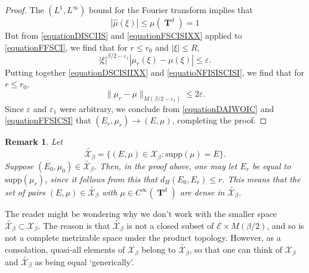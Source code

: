 \documentclass[12pt,reqno]{article}
\numberwithin{equation}{section}
\DeclareMathOperator{\TT}{\mathbf{T}}
\newtheorem{remark}{Remark}
\begin{document}
\begin{proof}
    The $(L^1,L^\infty)$ bound for the Fourier transform implies that
    \begin{equation} \label{equationFSCISIXX}
        |\widehat{\mu}(\xi)| \leq \mu(\TT^d) = 1
    \end{equation}
    But from \eqref{equationDISCIIS} and \eqref{equationFSCISIXX} applied to \eqref{equationFFSCI}, we find that for $r \leq r_0$ and $|\xi| \leq R$,
    \begin{equation} \label{equatioNFISISCISI}
        |\xi|^{\beta/2 - \varepsilon_1} |\mu_r(\xi) - \mu(\xi)| \leq \varepsilon.
    \end{equation}
    Putting together \eqref{equationDSCISIIXX} and \eqref{equatioNFISISCISI}, we find that for $r \leq r_0$,
    \begin{equation} \label{equationDAIWOIC}
        \| \mu_r - \mu \|_{M(\beta/2 - \varepsilon_1)} \leq 2\varepsilon.
    \end{equation}
    Since $\varepsilon$ and $\varepsilon_1$ were arbitrary, we conclude from \eqref{equationDAIWOIC} and \eqref{equationFFSICSI} that $(E_r,\mu_r) \to (E,\mu)$, completing the proof.
\end{proof}

\begin{remark} \label{remarkDOIWJDIOWJ2}
    Let
    \[ \tilde{\mathcal{X}_\beta} = \{ (E,\mu) \in \mathcal{X}_\beta : \text{supp}(\mu) = E \}. \]
    Suppose $(E_0,\mu_0) \in \tilde{\mathcal{X}_\beta}$. Then, in the proof above, one may let $E_r$ be equal to $\text{supp}(\mu_r)$, since it follows from this that $d_H(E_0,E_r) \leq r$. This means that the set of pairs $(E,\mu) \in \tilde{\mathcal{X}_\beta}$ with $\mu \in C^\infty(\TT^d)$ are dense in $\tilde{\mathcal{X}_\beta}$.
\end{remark}

The reader might be wondering why we don't work with the smaller space $\tilde{\mathcal{X}_\beta} \subset \mathcal{X}_\beta$. The reason is that $\tilde{\mathcal{X}_\beta}$ is not a closed subset of $\mathcal{E} \times M(\beta/2)$, and so is not a complete metrizable space under the product topology. However, as a consolation, quasi-all elements of $\mathcal{X}_\beta$ belong to $\tilde{\mathcal{X}_\beta}$, so that one can think of $\mathcal{X}_\beta$ and $\tilde{\mathcal{X}_\beta}$ as being equal `generically'.
\end{document}
